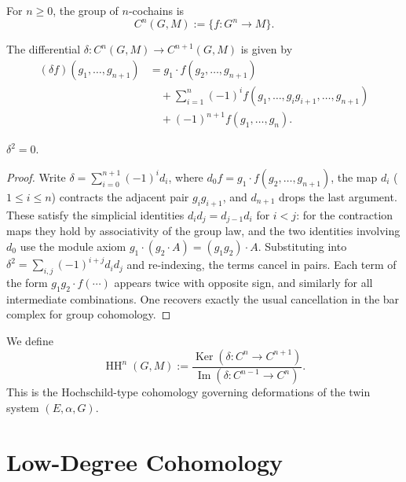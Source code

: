 \documentclass[11pt,a4paper]{article}
\numberwithin{equation}{section}
\DeclareMathOperator{\Ker}{Ker}
\DeclareMathOperator{\Img}{Im}
\DeclareMathOperator{\HH}{HH}
\newcommand{\TwinSpace}{(E,\alpha,G)}
\newcommand{\Cochain}{C}
\newcommand{\diff}{\delta}
\begin{document}
	\begin{definition}[Cochains]
		For $n\ge 0$, the group of $n$-cochains is
		\[
		\Cochain^n(G,M) := \{ f : G^n \to M \}.
		\]
	\end{definition}
	
	\begin{definition}
		The differential $\diff : \Cochain^n(G,M)\to \Cochain^{n+1}(G,M)$ is given by
		\begin{align*}
			(\diff f)(g_1,\dots,g_{n+1}) 
			&= g_1\cdot f(g_2,\dots,g_{n+1})
			\\&\quad + \sum_{i=1}^n (-1)^i f(g_1,\dots,g_ig_{i+1},\dots,g_{n+1})
			\\&\quad + (-1)^{n+1} f(g_1,\dots,g_n).
		\end{align*}
	\end{definition}
	
	\begin{proposition}
		$\diff^2=0$.
	\end{proposition}
	
	\begin{proof}
		Write $\diff=\sum_{i=0}^{n+1}(-1)^i d_i$, where $d_0 f=g_1\cdot f(g_2,\dots,g_{n+1})$, the map $d_i$ ($1\le i\le n$) contracts the adjacent pair $g_ig_{i+1}$, and $d_{n+1}$ drops the last argument. These satisfy the simplicial identities $d_i d_j=d_{j-1}d_i$ for $i<j$: for the contraction maps they hold by associativity of the group law, and the two identities involving $d_0$ use the module axiom $g_1\cdot(g_2\cdot A)=(g_1g_2)\cdot A$. Substituting into $\diff^2=\sum_{i,j}(-1)^{i+j}d_id_j$ and re-indexing, the terms cancel in pairs.
		Each term of the form $g_1g_2\cdot f(\cdots)$ appears twice with opposite sign,
		and similarly for all intermediate combinations.
		One recovers exactly the usual cancellation in the bar complex for group cohomology.
	\end{proof}
	
	\begin{definition}
		We define
		\[
		\HH^n(G,M) := \frac{\Ker(\diff : \Cochain^n\to \Cochain^{n+1})}{\Img(\diff : \Cochain^{n-1}\to \Cochain^n)}.
		\]
		This is the Hochschild-type cohomology governing deformations of the twin system $\TwinSpace$.
	\end{definition}
	
	\section{Low-Degree Cohomology}
	\label{sec:low-degree}
	
\end{document}
